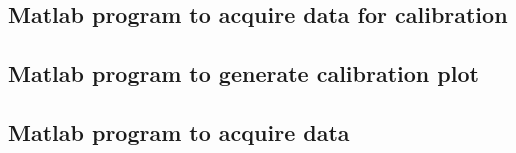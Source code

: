 \documentclass{article} %
\begin{document}
\clearpage

\subsection{Matlab program to acquire data for calibration}
\label{app:calibCode}


\clearpage
\subsection{Matlab program to generate calibration plot}
\label{app:genCalib}


\clearpage
\subsection{Matlab program to acquire data}
\label{app:acqCode}

\end{document}
